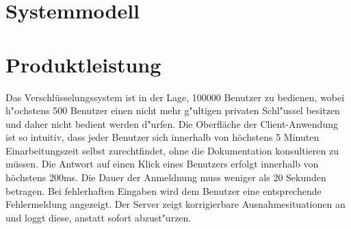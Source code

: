 \documentclass[a4paper,10pt]{scrartcl}
\begin{document}
\section{Systemmodell}





\section{Produktleistung}

\begin{usecase}
 {Das Verschlüsselungssystem ist in der Lage, 100000 Benutzer zu bedienen,
                wobei h"ochstens 500 Benutzer einen nicht mehr g"ultigen privaten Schl"ussel
                besitzen und daher nicht bedient werden d"urfen.}
 {Die Oberfläche der Client-Anwendung ist so intuitiv, dass jeder Benutzer
                sich innerhalb von höchstens 5 Minuten Einarbeitungszeit selbst
                zurechtfindet, ohne die Dokumentation konsultieren zu müssen.}
 {Die Antwort auf einen Klick eines Benutzers erfolgt innerhalb von
                höchstens 200ms.}
 {Die Dauer der Anmeldnung muss weniger als 20 Sekunden betragen.}
 {Bei fehlerhaften Eingaben wird dem Benutzer eine entsprechende
                Fehlermeldung angezeigt.}
 {Der Server zeigt korrigierbare Ausnahmesituationen an und loggt diese,
                anstatt sofort abzust"urzen.}
\end{usecase}
\end{document}

